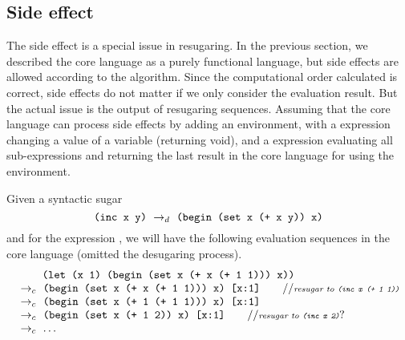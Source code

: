 \subsection{Side effect}


The side effect is a special issue in resugaring. In the previous section, we described the core language as a purely functional language, but side effects are allowed according to the algorithm. Since the computational order calculated is correct, side effects do not matter if we only consider the evaluation result. But the actual issue is the output of resugaring sequences. Assuming that the core language can process side effects by adding an environment, with a  expression changing a value of a variable (returning void), and a  expression evaluating all sub-expressions and returning the last result in the core language for using the environment.

Given a syntactic sugar 
\[\texttt{(inc x y)} ~\rightarrow_d~ \texttt{(begin (set x (+ x y)) x)}\]
and for the expression , we will have the following evaluation sequences in the core language (omitted the desugaring process).
\[
	\begin{array}{l}
		\qquad\;\texttt{(let (x 1) (begin (set x (+ x (+ 1 1))) x))}\\
	~\rightarrow_c~\texttt{(begin (set x (+ x (+ 1 1))) x) [x:1]} \qquad//{\scriptsize\emph{resugar to \texttt{(inc x (+ 1 1))}}}\\
	~\rightarrow_c~\texttt{(begin (set x (+ 1 (+ 1 1))) x) [x:1]} \\
	~\rightarrow_c~\texttt{(begin (set x (+ 1 2)) x) [x:1]} \qquad//{\scriptsize\emph{resugar to \texttt{(inc x 2)}}?}\\
	~\rightarrow_c~\ldots
	\end{array}
\]

